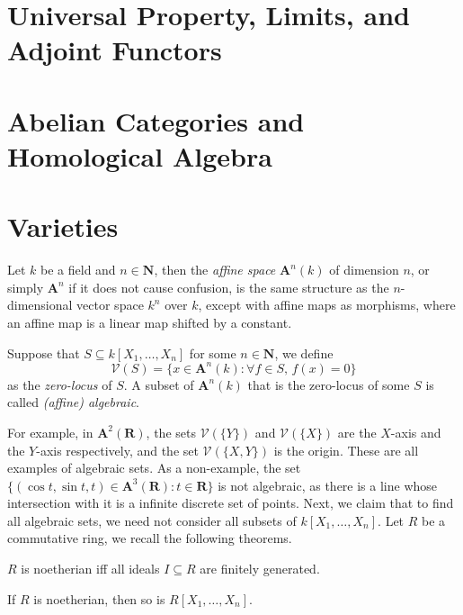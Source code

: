 \documentclass[11pt]{book}
\begin{document}
\newpage
\section{Universal Property, Limits, and Adjoint Functors}

\section{Abelian Categories and Homological Algebra}
\section{Varieties}
Let $k$ be a field and $n\in\mathbf N$, then the \textit{affine space} $\mathbf A^n(k)$ of dimension $n$, or simply $\mathbf A^n$ if it does not cause confusion, is the same structure as the $n$-dimensional vector space $k^n$ over $k$, except with affine maps as morphisms, where an affine map is a linear map shifted by a constant. 

\begin{definition}
Suppose that $S\subseteq k[X_1,\dots,X_n]$ for some $n\in\mathbf N$, we define
\[\mathcal{V}(S)=\{x\in \mathbf A^n(k):\forall f\in S,\,f(x)=0\}\]
as the \textit{zero-locus} of $S$. A subset of $\mathbf A^n(k)$ that is the zero-locus of some $S$ is called \textit{(affine) algebraic}.
\end{definition}
For example, in $\mathbf{A}^2(\mathbf R)$, the sets $\mathcal{V}(\{Y\})$ and $\mathcal{V}(\{X\})$ are the $X$-axis and the $Y$-axis respectively, and the set $\mathcal{V}(\{X,Y\})$ is the origin. These are all examples of algebraic sets. As a non-example, the set $\{(\cos t,\sin t,t)\in\mathbf A^3(\mathbf R):t\in\mathbf R\}$ is not algebraic, as there is a line whose intersection with it is a infinite discrete set of points. Next, we claim that to find all algebraic sets, we need not consider all subsets of $k[X_1,\dots,X_n]$. Let $R$ be a commutative ring, we recall the following theorems.
\begin{theorem}$R$ is noetherian iff all ideals $I\subseteq R$ are finitely generated.
\end{theorem}
\begin{theorem}If $R$ is noetherian, then so is $R[X_1,\dots,X_n]$.
\end{theorem}
\end{document}
